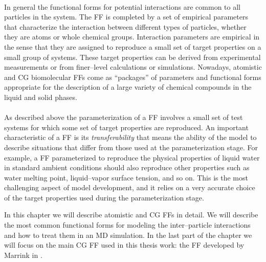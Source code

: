 \paragraph{\textbf{}} In general the functional forms for potential interactions are
common to all particles in the system. The \ac{FF} is completed by a set of empirical parameters that
characterize the interaction between different types of particles, whether they are atoms or whole chemical
groups. Interaction parameters are empirical in the sense that they are assigned to reproduce a small set of
target properties on a small group of systems. These target properties can be derived from experimental
measurements or from finer--level calculations or simulations. Nowadays, atomistic and \ac{CG} biomolecular
\acp{FF} come as ``packages'' of parameters and functional forms appropriate for the description of a large
variety of chemical compounds in the liquid and solid phases.

\paragraph{\textbf{}} As described above the parameterization of a \ac{FF} involves a
small set of test systems for which some set of target properties are reproduced. An important characteristic of a
\ac{FF} is its \textit{transferability} that means the ability of the model to describe situations that
differ from those used at the parameterization stage. For example, a \ac{FF} parameterized to reproduce the 
physical properties of liquid water in standard ambient conditions should also reproduce other properties such as 
water melting point, liquid--vapor surface tension, and so on. This is the most challenging aspect of model 
development, and it relies on a very accurate choice of the target properties used during the parameterization 
stage.\\\medskip

In this chapter we will describe atomistic and \ac{CG} \acp{FF} in detail. We will describe the most common 
functional forms for modeling the inter--particle interactions and how to treat them in an \ac{MD} simulation. In 
the last part of the chapter we will focus on the main \ac{CG} \ac{FF} used in this thesis work: the 
\martini \ac{FF} developed by Marrink \etal in \cite{Martini}.

